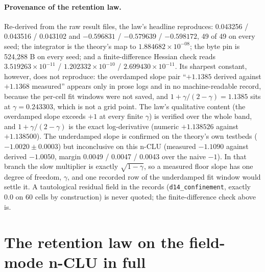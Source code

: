 \documentclass{article} %
\newcommand{\sci}[2]{\ensuremath{#1\times10^{#2}}}
\begin{document}
\paragraph{Provenance of the retention law.} Re-derived from the raw result files, the law's
headline reproduces: 0.043256 / 0.043516 / 0.043102 and $-0.596831$ / $-0.579639$ / $-0.598172$,
49 of 49 on every seed; the integrator is the theory's map to \sci{1.884682}{-08}; the byte pin is
524,288 B on every seed; and a finite-difference Hessian check reads \sci{3.519263}{-11} /
\sci{1.202332}{-10} / \sci{2.699430}{-11}. %
Its sharpest constant, however, does not reproduce: the overdamped slope pair ``$+1.1385$ derived
against $+1.1368$ measured'' appears only in prose logs and in no machine-readable record,
because the per-cell fit windows were not saved, and $1+\gamma/(2-\gamma)=1.1385$ sits at
$\gamma=0.243303$, which is not a grid point. The law's qualitative content (the overdamped slope
exceeds $+1$ at every finite $\gamma$) is verified over the whole band, and $1+\gamma/(2-\gamma)$ is
the exact log-derivative (numeric $+1.138526$ against $+1.138500$). The underdamped slope is
confirmed on the theory's own testbeds ($-1.0020\pm0.0003$) but inconclusive on this n-CLU (measured
$-1.1090$ against derived $-1.0050$, margin 0.0049 / 0.0047 / 0.0043 over the naive $-1$). In that
branch the slow multiplier is exactly $\sqrt{1-\gamma}$, so a measured floor slope has one degree of
freedom, $\gamma$, and one recorded row of the underdamped fit window would settle it. A tautological
residual field in the records (\texttt{d14\_confinement}, exactly 0.0 on 60 cells by construction)
is never quoted; the finite-difference check above is. %

\section{The retention law on the field-mode n-CLU in full}
\label{app:physics}
\end{document}
